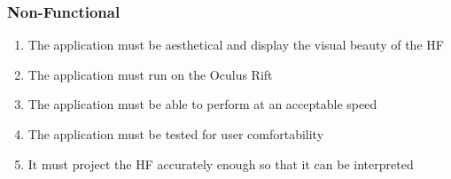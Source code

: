 \documentclass[12pt]{article} %
\begin{document}
\begin{flushleft}
\subsubsection{Non-Functional} %
\begin{enumerate}
\item The application must be aesthetical and display the visual beauty of the HF
\item The application must run on the Oculus Rift 
\item The application must be able to perform at an acceptable speed 
\item The application must be tested for user comfortability
\item It must project the HF accurately enough so that it can be interpreted
\end{enumerate}

\end{flushleft}
\end{document}
